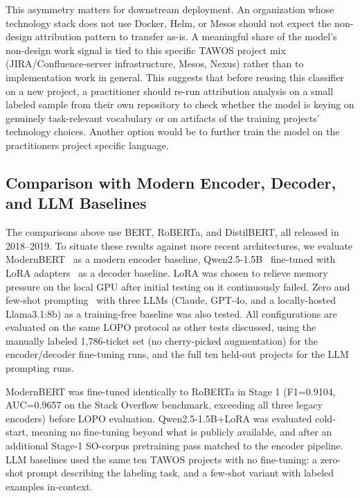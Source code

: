 \documentclass[preprint,12pt]{elsarticle}
\begin{document}
This asymmetry matters for downstream deployment. An organization whose technology stack does not use Docker, Helm, or Mesos should not expect the non-design attribution pattern to transfer as-is. A meaningful share of the model's non-design work signal is tied to this specific TAWOS project mix (JIRA/Confluence-server infrastructure, Mesos, Nexus) rather than to implementation work in general. This suggests that before reusing this classifier on a new project, a practitioner should re-run attribution analysis on a small labeled sample from their own repository to check whether the model is keying on genuinely task-relevant vocabulary or on artifacts of the training projects' technology choices. Another option would be to further train the model on the practitioners project specific language.

\subsection{Comparison with Modern Encoder, Decoder, and LLM Baselines}
\label{sec:llm-baselines}

The comparisons above use BERT, RoBERTa, and DistilBERT, all released in 2018--2019. To situate these results against more recent architectures, we evaluate ModernBERT~\cite{warner2024modernbert} as a modern encoder baseline, Qwen2.5-1.5B~\cite{qwen2024technical} fine-tuned with LoRA adapters~\cite{hu2022lora} as a decoder baseline. LoRA was chosen to relieve memory pressure on the local GPU after initial testing on it continuously failed. Zero and few-shot prompting~\cite{brown2020fewshot} with three LLMs (Claude, GPT-4o, and a locally-hosted Llama3.1:8b) as a training-free baseline was also tested. All configurations are evaluated on the same LOPO protocol as other tests discussed, using the manually labeled 1,786-ticket set (no cherry-picked augmentation) for the encoder/decoder fine-tuning runs, and the full ten held-out projects for the LLM prompting runs.


ModernBERT was fine-tuned identically to RoBERTa in Stage 1 (F1=0.9104, AUC=0.9657 on the Stack Overflow benchmark, exceeding all three legacy encoders) before LOPO evaluation. Qwen2.5-1.5B+LoRA was evaluated cold-start, meaning no fine-tuning beyond what is publicly available, and after an additional Stage-1 SO-corpus pretraining pass matched to the encoder pipeline. LLM baselines used the same ten TAWOS projects with no fine-tuning: a zero-shot prompt describing the labeling task, and a few-shot variant with labeled examples in-context.
\end{document}
